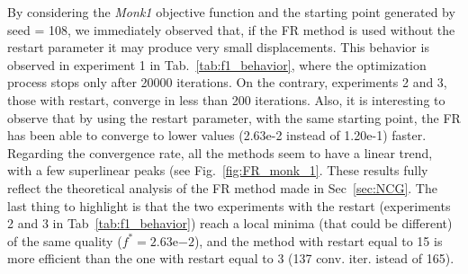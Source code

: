 \documentclass[11pt]{article}
\begin{document}
  By considering the \textit{Monk1} objective function and the starting point generated by seed = 108, we immediately observed that, if the FR method is used without the restart parameter it may produce very small displacements. This behavior is observed in experiment 1 in Tab.~\ref{tab:f1_behavior}, where the optimization process stops only after 20000 iterations. On the contrary, experiments 2 and 3, those with restart, converge in less than 200 iterations. Also, it is interesting to observe that by using the restart parameter, with the same starting point, the FR has been able to converge to lower values (2.63e-2 instead of 1.20e-1) faster. Regarding the convergence rate, all the methods seem to have a linear trend, with a few superlinear peaks (see Fig.~\ref{fig:FR_monk_1}. These results fully reflect the theoretical analysis of the FR method made in Sec~\ref{sec:NCG}. The last thing to highlight is that the two experiments with the restart (experiments 2 and 3 in Tab~\ref{tab:f1_behavior}) reach a local minima (that could be different) of the same quality ($f^* = 2.63\mathrm{e}{-2}$), and the method with restart equal to 15 is more efficient than the one with restart equal to 3 (137 conv. iter. istead of 165). 
\end{document}
